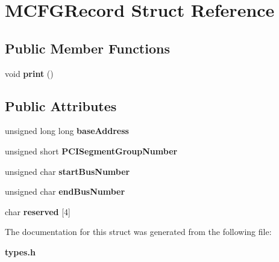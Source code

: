 \section{M\+C\+F\+G\+Record Struct Reference}
\label{structMCFGRecord}
\subsection*{Public Member Functions}
\begin{DoxyCompactItemize}
\item 
void {\bfseries print} ()\label{structMCFGRecord_a4b954297f9dd2db580af3305dc2c1200}

\end{DoxyCompactItemize}
\subsection*{Public Attributes}
\begin{DoxyCompactItemize}
\item 
unsigned long long {\bfseries base\+Address}\label{structMCFGRecord_ab80de5ed728d89f1bd60647e0e909289}

\item 
unsigned short {\bfseries P\+C\+I\+Segment\+Group\+Number}\label{structMCFGRecord_a2ead77d33416e9f9a8607c7bdc9a3aa4}

\item 
unsigned char {\bfseries start\+Bus\+Number}\label{structMCFGRecord_a88a45ddf628776154cb5ed02b384061d}

\item 
unsigned char {\bfseries end\+Bus\+Number}\label{structMCFGRecord_a39692440cf50265f71b638d433a7ce37}

\item 
char {\bfseries reserved} [4]\label{structMCFGRecord_a549591813ff09495f6ee59cb3288f130}

\end{DoxyCompactItemize}


The documentation for this struct was generated from the following file\+:\begin{DoxyCompactItemize}
\item 
{\bf types.\+h}\end{DoxyCompactItemize}
